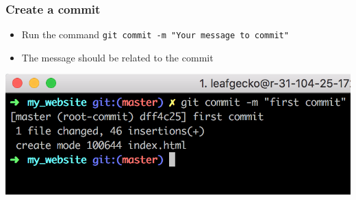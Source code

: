 \documentclass[12pt]{beamer}
\begin{document}
\begin{frame}
\frametitle{Create a commit}
\begin{itemize}
	\item Run the command \texttt{git commit -m "Your message to commit"}
	\item The message should be related to the commit
\end{itemize}
\begin{center}
	\includegraphics[width=0.7\linewidth]{git_commit_screenshot}
\end{center}
\end{frame}
\end{document}
